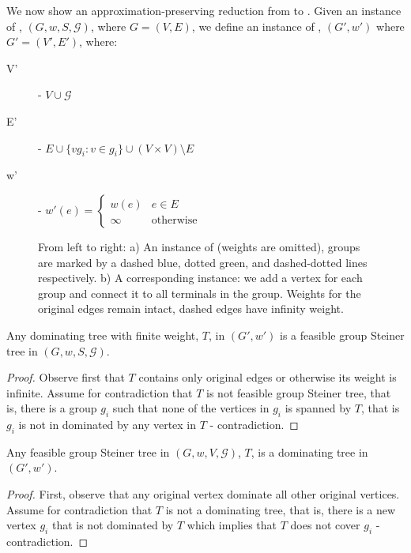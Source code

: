 We now show an approximation-preserving reduction from \ProbGroup{} to
\Prob{}.
Given an instance of \ProbGroup{}, $(G, w, S, \mathcal{G})$, where $G = (V, E)$, 
we define an instance of \Prob{},
$(G', w')$ where $G' = (V', E')$, where:
\begin{description}
\item[V'] - $V \cup \mathcal{G}$
\item[E'] - $E \cup \{vg_i : v \in g_i\} \cup (V \times V) \setminus E$
\item[w'] - $
w'(e) = 
\begin{cases}
w(e) 	& e \in E
\\
\infty & \text{otherwise}
\end{cases}
$
\end{description}


\begin{figure}
\begin{center}

\end{center}
\caption{\label{fig:prob-geq-group}
From left to right:
a) An instance of \ProbGroup{} (weights are omitted), 
groups are marked by a dashed blue, dotted green, and dashed-dotted lines respectively.  
b) A corresponding \Prob{} instance: we add a vertex for each group and connect it 
to all terminals in the group.
Weights for the original edges remain intact, dashed edges have infinity weight.   
}
\end{figure}

\begin{claim}
Any dominating tree with finite weight, $T$, in $(G', w')$ is a feasible group Steiner tree in 
$(G, w, S, \mathcal{G})$.
\end{claim}

\begin{proof}
Observe first that $T$ contains only original edges or otherwise its weight is infinite.  
Assume for contradiction that $T$ is not feasible group Steiner tree, that is, there is 
a group $g_i$ such that none of the vertices in $g_i$ is spanned by $T$, that is $g_i$
is not in dominated by any vertex in $T$ - contradiction. 
\end{proof}
 
\begin{claim}
Any feasible group Steiner tree in $(G, w, V, \mathcal{G})$, $T$, is a dominating tree
in $(G', w')$.
\end{claim}

\begin{proof}
First, observe that any original vertex dominate all other original vertices.
Assume for contradiction that $T$ is not a dominating tree, that is, there is 
a new vertex $g_i$ that is not dominated by $T$ which implies that 
$T$ does not cover $g_i$ - contradiction. 
\end{proof}